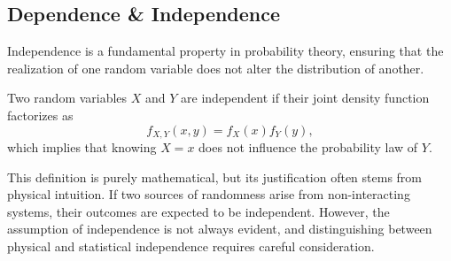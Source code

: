 \documentclass[10pt, headings=standardclasses, parskip=half, twoside]{scrartcl}
\newcommand{\dif}{\mathrm{d}}
\newcommand{\Prob}{\operatorname{P}}
\begin{document}



\subsection{Dependence \& Independence}\label{subsec:independence}
Independence is a fundamental property in probability theory, ensuring that the realization of one random variable does not alter the distribution of another. 

\begin{definition}[Independence]\label{def:independence}
Two random variables \(X\) and \(Y\) are independent if their joint density function factorizes as
\[
f_{X,Y}(x,y)=f_X(x)f_Y(y),
\]
which implies that knowing \(X=x\) does not influence the probability law of \(Y\).
\end{definition}
This definition is purely mathematical, but its justification often stems from physical intuition. 
If two sources of randomness arise from non-interacting systems, their outcomes are expected to be independent. 
However, the assumption of independence is not always evident, and distinguishing between physical and statistical independence requires careful consideration.
\end{document}
